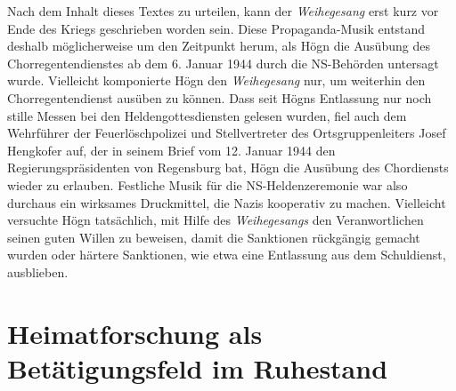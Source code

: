 \documentclass{book}
\begin{document}
Nach dem Inhalt dieses Textes zu urteilen, kann der \textit{Weihegesang}
erst kurz vor Ende des Kriegs geschrieben worden sein. Diese
Propaganda-Musik entstand deshalb möglicherweise um den Zeitpunkt
herum, als Högn die Ausübung des Chorregentendienstes ab dem 6.
Januar 1944 durch die NS-Behörden untersagt wurde. Vielleicht
komponierte Högn den \textit{Weihegesang} nur, um weiterhin den
Chorregentendienst ausüben zu können. Dass seit Högns Entlassung nur
noch stille Messen bei den Heldengottesdiensten gelesen wurden, fiel
auch dem Wehrführer der Feuerlöschpolizei und Stellvertreter des
Ortsgruppenleiters Josef Hengkofer auf, der in seinem Brief vom 12.
Januar 1944 den Regierungspräsidenten von Regensburg bat, Högn die
Ausübung des Chordiensts wieder zu erlauben. Festliche Musik für die
NS-Heldenzeremonie war also durchaus ein wirksames Druckmittel, die
Nazis kooperativ zu machen. Vielleicht versuchte Högn tatsächlich, mit
Hilfe des \textit{Weihegesangs} den Veranwortlichen seinen guten Willen
zu beweisen, damit die Sanktionen rückgängig gemacht wurden oder
härtere Sanktionen, wie etwa eine Entlassung aus dem Schuldienst,
ausblieben.

\section{Heimatforschung als Betätigungsfeld im Ruhestand}
\end{document}
